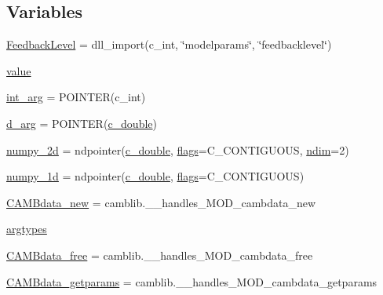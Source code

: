 \subsection*{Variables}
\begin{DoxyCompactItemize}
\item 
\mbox{\hyperlink{namespacecamb_1_1camb_a46c7b4fa92f12fb863c881ba88e35a8e}{Feedback\+Level}} = dll\+\_\+import(c\+\_\+int, \char`\"{}modelparams\char`\"{}, \char`\"{}feedbacklevel\char`\"{})
\item 
\mbox{\hyperlink{namespacecamb_1_1camb_aec5b3dae7749fd62cdb87c9933d69b06}{value}}
\item 
\mbox{\hyperlink{namespacecamb_1_1camb_a9e194516acd41f6579011e26d65a6d73}{int\+\_\+arg}} = P\+O\+I\+N\+T\+ER(c\+\_\+int)
\item 
\mbox{\hyperlink{namespacecamb_1_1camb_a44bc6eb27388b576f6c26774a6ebe166}{d\+\_\+arg}} = P\+O\+I\+N\+T\+ER(\mbox{\hyperlink{namespacecamb_1_1camb_a9bb9b4d27cefdc5b8d0c9ecf508462cf}{c\+\_\+double}})
\item 
\mbox{\hyperlink{namespacecamb_1_1camb_aaccb5cdabc7a4aff9696405380103e7e}{numpy\+\_\+2d}} = ndpointer(\mbox{\hyperlink{namespacecamb_1_1camb_a9bb9b4d27cefdc5b8d0c9ecf508462cf}{c\+\_\+double}}, \mbox{\hyperlink{namespacecamb_1_1camb_aa84470703add02037beda61ea31c02e9}{flags}}=\textquotesingle{}C\+\_\+\+C\+O\+N\+T\+I\+G\+U\+O\+US\textquotesingle{}, \mbox{\hyperlink{namespacecamb_1_1camb_a1ab298aa884f117a7e6b56a81f694806}{ndim}}=2)
\item 
\mbox{\hyperlink{namespacecamb_1_1camb_a3d113b2f49bb7733dfa37b76ea4da9b0}{numpy\+\_\+1d}} = ndpointer(\mbox{\hyperlink{namespacecamb_1_1camb_a9bb9b4d27cefdc5b8d0c9ecf508462cf}{c\+\_\+double}}, \mbox{\hyperlink{namespacecamb_1_1camb_aa84470703add02037beda61ea31c02e9}{flags}}=\textquotesingle{}C\+\_\+\+C\+O\+N\+T\+I\+G\+U\+O\+US\textquotesingle{})
\item 
\mbox{\hyperlink{namespacecamb_1_1camb_a9de9875d8abacf901661b8054198a43e}{C\+A\+M\+Bdata\+\_\+new}} = camblib.\+\_\+\+\_\+handles\+\_\+\+M\+O\+D\+\_\+cambdata\+\_\+new
\item 
\mbox{\hyperlink{namespacecamb_1_1camb_ae5d9b68b413cd817263baf430603735e}{argtypes}}
\item 
\mbox{\hyperlink{namespacecamb_1_1camb_ae2649e23085c98f0925a9737b32b9059}{C\+A\+M\+Bdata\+\_\+free}} = camblib.\+\_\+\+\_\+handles\+\_\+\+M\+O\+D\+\_\+cambdata\+\_\+free
\item 
\mbox{\hyperlink{namespacecamb_1_1camb_af4210155d6c19ae51ec7eeab62193b0f}{C\+A\+M\+Bdata\+\_\+getparams}} = camblib.\+\_\+\+\_\+handles\+\_\+\+M\+O\+D\+\_\+cambdata\+\_\+getparams

\end{DoxyCompactItemize}
